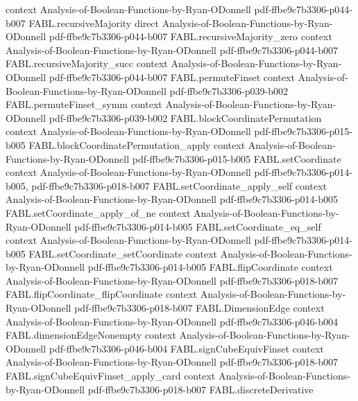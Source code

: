 \begin{theorem}
  {context}
  {Analysis-of-Boolean-Functions-by-Ryan-ODonnell}
  {pdf-ffbe9c7b3306-p044-b007}
\proofstep
  {FABL.recursiveMajority}
  {direct}
  {Analysis-of-Boolean-Functions-by-Ryan-ODonnell}
  {pdf-ffbe9c7b3306-p044-b007}
\proofstep
  {FABL.recursiveMajority_zero}
  {context}
  {Analysis-of-Boolean-Functions-by-Ryan-ODonnell}
  {pdf-ffbe9c7b3306-p044-b007}
\proofstep
  {FABL.recursiveMajority_succ}
  {context}
  {Analysis-of-Boolean-Functions-by-Ryan-ODonnell}
  {pdf-ffbe9c7b3306-p044-b007}
\proofstep
  {FABL.permuteFinset}
  {context}
  {Analysis-of-Boolean-Functions-by-Ryan-ODonnell}
  {pdf-ffbe9c7b3306-p039-b002}
\proofstep
  {FABL.permuteFinset_symm}
  {context}
  {Analysis-of-Boolean-Functions-by-Ryan-ODonnell}
  {pdf-ffbe9c7b3306-p039-b002}
\proofstep
  {FABL.blockCoordinatePermutation}
  {context}
  {Analysis-of-Boolean-Functions-by-Ryan-ODonnell}
  {pdf-ffbe9c7b3306-p015-b005}
\proofstep
  {FABL.blockCoordinatePermutation_apply}
  {context}
  {Analysis-of-Boolean-Functions-by-Ryan-ODonnell}
  {pdf-ffbe9c7b3306-p015-b005}
\proofstep
  {FABL.setCoordinate}
  {context}
  {Analysis-of-Boolean-Functions-by-Ryan-ODonnell}
  {pdf-ffbe9c7b3306-p014-b005,
    pdf-ffbe9c7b3306-p018-b007}
\proofstep
  {FABL.setCoordinate_apply_self}
  {context}
  {Analysis-of-Boolean-Functions-by-Ryan-ODonnell}
  {pdf-ffbe9c7b3306-p014-b005}
\proofstep
  {FABL.setCoordinate_apply_of_ne}
  {context}
  {Analysis-of-Boolean-Functions-by-Ryan-ODonnell}
  {pdf-ffbe9c7b3306-p014-b005}
\proofstep
  {FABL.setCoordinate_eq_self}
  {context}
  {Analysis-of-Boolean-Functions-by-Ryan-ODonnell}
  {pdf-ffbe9c7b3306-p014-b005}
\proofstep
  {FABL.setCoordinate_setCoordinate}
  {context}
  {Analysis-of-Boolean-Functions-by-Ryan-ODonnell}
  {pdf-ffbe9c7b3306-p014-b005}
\proofstep
  {FABL.flipCoordinate}
  {context}
  {Analysis-of-Boolean-Functions-by-Ryan-ODonnell}
  {pdf-ffbe9c7b3306-p018-b007}
\proofstep
  {FABL.flipCoordinate_flipCoordinate}
  {context}
  {Analysis-of-Boolean-Functions-by-Ryan-ODonnell}
  {pdf-ffbe9c7b3306-p018-b007}
\proofstep
  {FABL.DimensionEdge}
  {context}
  {Analysis-of-Boolean-Functions-by-Ryan-ODonnell}
  {pdf-ffbe9c7b3306-p046-b004}
\proofstep
  {FABL.dimensionEdgeNonempty}
  {context}
  {Analysis-of-Boolean-Functions-by-Ryan-ODonnell}
  {pdf-ffbe9c7b3306-p046-b004}
\proofstep
  {FABL.signCubeEquivFinset}
  {context}
  {Analysis-of-Boolean-Functions-by-Ryan-ODonnell}
  {pdf-ffbe9c7b3306-p018-b007}
\proofstep
  {FABL.signCubeEquivFinset_apply_card}
  {context}
  {Analysis-of-Boolean-Functions-by-Ryan-ODonnell}
  {pdf-ffbe9c7b3306-p018-b007}
\proofstep
  {FABL.discreteDerivative}

\end{theorem}
